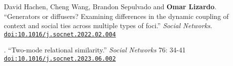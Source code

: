 


\ind David Hachen, Cheng Wang, Brandon Sepulvado and {\bf Omar Lizardo}. ``Generators or diffusers? Examining differences in the dynamic coupling of context and social ties across multiple types of foci.'' {\em Social Networks}. \href{https://doi.org/10.1016/j.socnet.2022.02.004}{\nolinkurl{doi:10.1016/j.socnet.2022.02.004}}

. ``Two-mode relational similarity.'' {\em Social Networks}  76: 34-41 \href{https://doi.org/10.1016/j.socnet.2023.06.002}{\nolinkurl{doi:10.1016/j.socnet.2023.06.002}}

